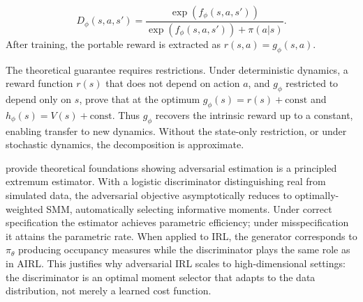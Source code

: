 \begin{equation}
    D_\phi(s,a,s') = \frac{\exp(f_\phi(s,a,s'))}{\exp(f_\phi(s,a,s')) + \pi(a|s)}.
\label{eq:airl_discriminator}
\end{equation}
After training, the portable reward is extracted as $r(s,a) = g_\phi(s,a)$.

The theoretical guarantee requires restrictions. Under deterministic dynamics, a reward function $r(s)$ that does not depend on action $a$, 
and $g_\phi$ restricted to depend only on $s$, \citet{fu:2018} prove that at the optimum $g_\phi(s) = r(s) + \text{const}$ and $h_\phi(s) = V(s) + \text{const}$. Thus $g_\phi$ recovers the intrinsic reward up to a constant, enabling transfer to new dynamics. Without the state-only restriction, or under stochastic dynamics, the decomposition is approximate. 

\citet{kaji:2023} provide theoretical foundations showing adversarial estimation is a principled extremum estimator. With a logistic discriminator distinguishing real from simulated data, the adversarial objective asymptotically reduces to optimally-weighted SMM, automatically selecting informative moments. Under correct specification the estimator achieves parametric efficiency; under misspecification it attains the parametric rate. When applied to IRL, the generator corresponds to $\pi_\theta$ producing occupancy measures while the discriminator plays the same role as in AIRL. This justifies why adversarial IRL scales to high-dimensional settings: the discriminator is an optimal moment selector that adapts to the data distribution, not merely a learned cost function. 

